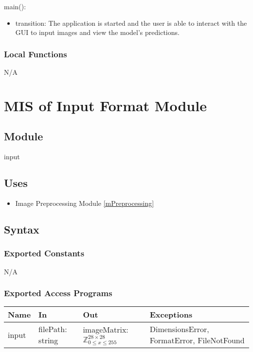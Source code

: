 \documentclass[12pt, titlepage]{article}
\begin{document}
\noindent main():
\begin{itemize}
\item transition: The application is started and the user is able to interact
with the GUI to input images and view the model's predictions.
\end{itemize}


\subsubsection{Local Functions}

N/A

\section{MIS of Input Format Module} \label{MInput}

\subsection{Module}

input

\subsection{Uses}

\begin{itemize}
  \item Image Preprocessing Module \ref{mPreprocessing}
\end{itemize}

\subsection{Syntax}

\subsubsection{Exported Constants}

N/A

\subsubsection{Exported Access Programs}

\begin{center}
\begin{tabular}{p{2cm} p{2cm} p{3cm} p{6cm}}
\hline
\textbf{Name} & \textbf{In} & \textbf{Out} & \textbf{Exceptions} \\
\hline
input & filePath: string & imageMatrix: $\mathbb{Z}^{28 \times 28}_{0 \le x \le 255}$ & DimensionsError, FormatError, FileNotFound \\
\hline
\end{tabular}
\end{center}
\end{document}
